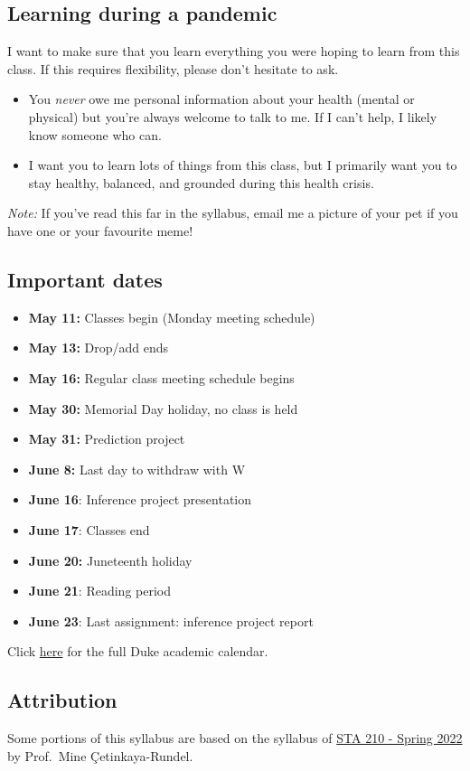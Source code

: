 \documentclass[
  letterpaper,
  DIV=11,
  numbers=noendperiod]{scrartcl}
\providecommand{\tightlist}{%
  \setlength{\itemsep}{0pt}\setlength{\parskip}{0pt}}
\begin{document}
\hypertarget{learning-during-a-pandemic}{%
\subsection{\texorpdfstring{\textbf{Learning during a
pandemic}}{Learning during a pandemic}}\label{learning-during-a-pandemic}}

I want to make sure that you learn everything you were hoping to learn
from this class. If this requires flexibility, please don't hesitate to
ask.

\begin{itemize}
\item
  You \emph{never} owe me personal information about your health (mental
  or physical) but you're always welcome to talk to me. If I can't help,
  I likely know someone who can.
\item
  I want you to learn lots of things from this class, but I primarily
  want you to stay healthy, balanced, and grounded during this health
  crisis.
\end{itemize}

\emph{Note:} If you've read this far in the syllabus, email me a picture
of your pet if you have one or your favourite meme!

\hypertarget{important-dates}{%
\subsection{Important dates}\label{important-dates}}

\begin{itemize}
\tightlist
\item
  \textbf{May 11:} Classes begin (Monday meeting schedule)
\item
  \textbf{May 13:} Drop/add ends
\item
  \textbf{May 16:} Regular class meeting schedule begins
\item
  \textbf{May 30:} Memorial Day holiday, no class is held
\item
  \textbf{May 31:} Prediction project
\item
  \textbf{June 8:} Last day to withdraw with W
\item
  \textbf{June 16}: Inference project presentation
\item
  \textbf{June 17}: Classes end
\item
  \textbf{June 20:} Juneteenth holiday
\item
  \textbf{June 21}: Reading period
\item
  \textbf{June 23}: Last assignment: inference project report
\end{itemize}

Click
\href{https://registrar.duke.edu/sumemr-2022-academic-calendar}{here}
for the full Duke academic calendar.

\hypertarget{attribution}{%
\subsection{Attribution}\label{attribution}}

Some portions of this syllabus are based on the syllabus of
\href{https://sta210-s22.github.io/website/}{STA 210 - Spring 2022} by
Prof.~Mine Çetinkaya-Rundel.
\end{document}
